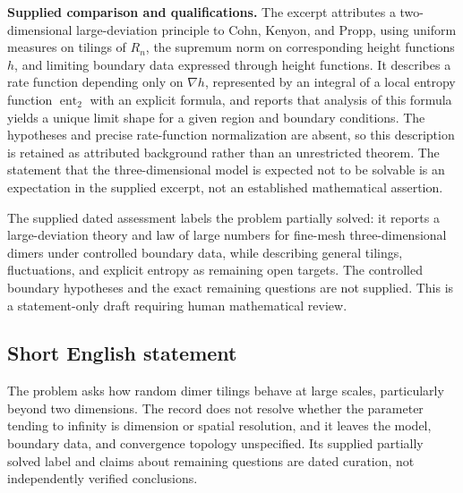 \documentclass[11pt]{article}
\begin{document}
\textbf{Supplied comparison and qualifications.} The excerpt attributes a two-dimensional large-deviation principle to Cohn, Kenyon, and Propp, using uniform measures on tilings of \(R_n\), the supremum norm on corresponding height functions \(h\), and limiting boundary data expressed through height functions. It describes a rate function depending only on \(\nabla h\), represented by an integral of a local entropy function \(\operatorname{ent}_2\) with an explicit formula, and reports that analysis of this formula yields a unique limit shape for a given region and boundary conditions. The hypotheses and precise rate-function normalization are absent, so this description is retained as attributed background rather than an unrestricted theorem. The statement that the three-dimensional model is expected not to be solvable is an expectation in the supplied excerpt, not an established mathematical assertion.

The supplied dated assessment labels the problem partially solved: it reports a large-deviation theory and law of large numbers for fine-mesh three-dimensional dimers under controlled boundary data, while describing general tilings, fluctuations, and explicit entropy as remaining open targets. The controlled boundary hypotheses and the exact remaining questions are not supplied. This is a statement-only draft requiring human mathematical review.
\subsection{Short English statement}
The problem asks how random dimer tilings behave at large scales, particularly beyond two dimensions. The record does not resolve whether the parameter tending to infinity is dimension or spatial resolution, and it leaves the model, boundary data, and convergence topology unspecified. Its supplied partially solved label and claims about remaining questions are dated curation, not independently verified conclusions.
\end{document}
